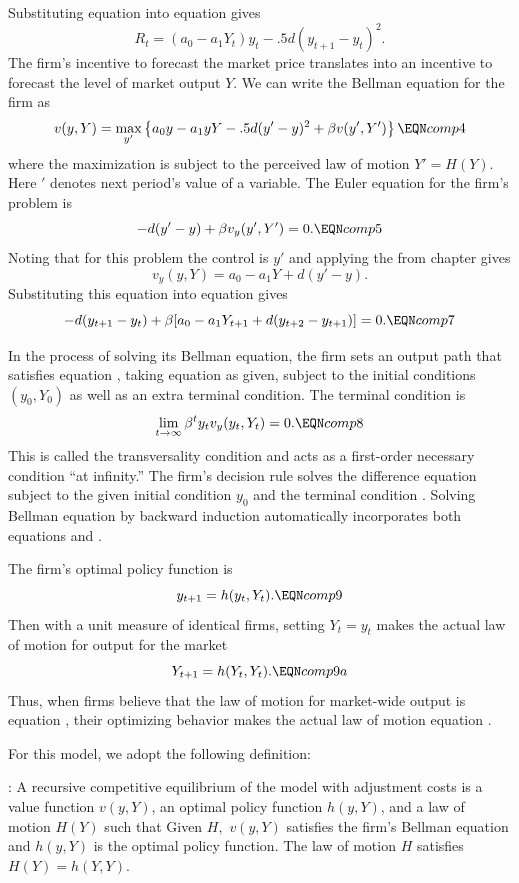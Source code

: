 Substituting equation  into equation  gives
$$ R_t = (a_0 - a_1 Y_t) y_t - .5 d (y_{t+1} - y_t )^2. $$
The firm's incentive to forecast the market price
translates into an incentive to forecast
the level of market output $Y$.
We can write the Bellman equation for the firm
as
$$ v(y,Y) = \max_{y'} \left\{ a_0 y - a_1 y Y - .5 d (y' - y)^2
      + \beta v(y', Y')\right\}  \EQN comp4$$
where the maximization is subject to the perceived law of motion $Y'=H(Y)$.
Here $'$ denotes next period's value of a variable.
The Euler equation for the firm's problem is
$$ - d(y' - y) + \beta v_y(y',Y') =0. \EQN comp5$$
Noting that for this problem the control is $y'$ and applying
the  from chapter  %
 gives
$$ v_y(y,Y) = a_0 - a_1 Y + d(y' - y). $$
Substituting this equation into equation  gives
$$ -d(y_{t+1} - y_t) + \beta [a_0 - a_1 Y_{t+1} + d(y_{t+2} - y_{t+1} )] =0.
\EQN comp7  $$

In the process of
solving its Bellman equation,
the firm sets  an output   path  that satisfies equation
, taking equation
  as given,  subject to the initial conditions
$(y_0, Y_0)$ as well as an extra
terminal condition.  The  terminal condition is
$$ \lim_{t \rightarrow \infty } \beta^t y_t v_y(y_{t}, Y_t) = 0. \EQN comp8  $$
This is called the %
transversality condition and acts as
 a first-order necessary  condition  ``at infinity.''
The firm's decision rule solves the difference
equation  subject to the given initial condition
$y_0$ and the terminal condition .
Solving  Bellman equation  by backward induction automatically
incorporates both equations  and .

  The  firm's optimal policy function is
$$ y_{t+1} = h(y_t, Y_t). \EQN comp9 $$
Then with a unit measure of  identical firms, setting $Y_t = y_t$ makes
 the actual law of motion for
output for the market
$$ Y_{t+1} = h(Y_t, Y_t). \EQN comp9a $$
Thus, when firms believe that the law of motion for market-wide
 output is equation , their optimizing behavior makes
the actual law of motion equation .

  For this model, we adopt the following
definition:

:  A recursive competitive equilibrium of
the model with adjustment costs is a value function
$v(y, Y)$, an optimal policy function
$h(y, Y)$, and   a law of motion $H(Y)$ such that
\medskip
{} Given $H,$ $v(y,Y)$ satisfies the firm's Bellman
equation and $h(y,Y)$ is the optimal policy function.
\medskip
{}  The law of motion $H$ satisfies $H(Y)= h(Y,Y)$.

